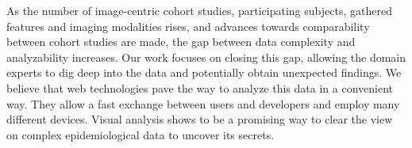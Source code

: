 \documentclass[journal]{style/vgtc} 			          %
\begin{document}
%
%
As the number of image-centric cohort studies, participating subjects, gathered features and imaging modalities rises, and advances towards comparability between cohort studies are made, the gap between data complexity and analyzability increases.
%
Our work focuses on closing this gap, allowing the domain experts to dig deep into the data and potentially obtain unexpected findings.
%
We believe that web technologies pave the way to analyze this data in a convenient way.
%
They allow a fast exchange between users and developers and employ many different devices.
%
Visual analysis shows to be a promising way to clear the view on complex epidemiological data to uncover its secrets.

\clearpage
\newpage


\end{document}
